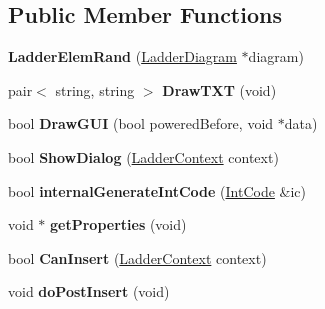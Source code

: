 \subsection*{Public Member Functions}
\begin{DoxyCompactItemize}
\item 
\hypertarget{class_ladder_elem_rand_aa6c386ced93085800a74b355d0181a77}{{\bfseries Ladder\-Elem\-Rand} (\hyperlink{class_ladder_diagram}{Ladder\-Diagram} $\ast$diagram)}\label{class_ladder_elem_rand_aa6c386ced93085800a74b355d0181a77}

\item 
\hypertarget{class_ladder_elem_rand_ac10a5a59c4e2688fe08eddbcb322645b}{pair$<$ string, string $>$ {\bfseries Draw\-T\-X\-T} (void)}\label{class_ladder_elem_rand_ac10a5a59c4e2688fe08eddbcb322645b}

\item 
\hypertarget{class_ladder_elem_rand_a79dc498685cc6bc6e6230cd721cd6617}{bool {\bfseries Draw\-G\-U\-I} (bool powered\-Before, void $\ast$data)}\label{class_ladder_elem_rand_a79dc498685cc6bc6e6230cd721cd6617}

\item 
\hypertarget{class_ladder_elem_rand_af80e8304564cc76f9c6ac3cd1dd6ba6c}{bool {\bfseries Show\-Dialog} (\hyperlink{struct_ladder_context}{Ladder\-Context} context)}\label{class_ladder_elem_rand_af80e8304564cc76f9c6ac3cd1dd6ba6c}

\item 
\hypertarget{class_ladder_elem_rand_ad15f51b48a233092db4cc0513f27a14e}{bool {\bfseries internal\-Generate\-Int\-Code} (\hyperlink{class_int_code}{Int\-Code} \&ic)}\label{class_ladder_elem_rand_ad15f51b48a233092db4cc0513f27a14e}

\item 
\hypertarget{class_ladder_elem_rand_aaddd0e7ff16a0d7cda04ef9d1b0a0853}{void $\ast$ {\bfseries get\-Properties} (void)}\label{class_ladder_elem_rand_aaddd0e7ff16a0d7cda04ef9d1b0a0853}

\item 
\hypertarget{class_ladder_elem_rand_a4cdc5b7c5c9a3906dff228f3110962b7}{bool {\bfseries Can\-Insert} (\hyperlink{struct_ladder_context}{Ladder\-Context} context)}\label{class_ladder_elem_rand_a4cdc5b7c5c9a3906dff228f3110962b7}

\item 
\hypertarget{class_ladder_elem_rand_a298b80c6faf1a956a1ca3a04fed5f540}{void {\bfseries do\-Post\-Insert} (void)}\label{class_ladder_elem_rand_a298b80c6faf1a956a1ca3a04fed5f540}


\end{DoxyCompactItemize}

